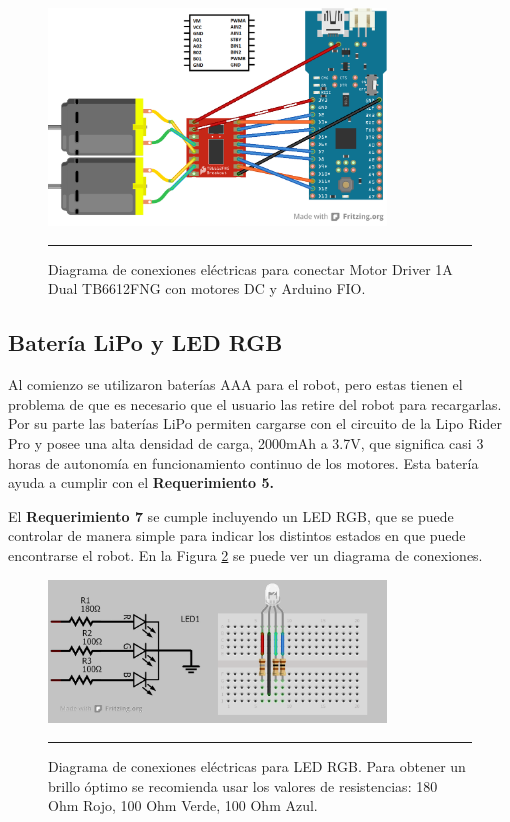 \begin{figure}[htbp]
	\centering
		\includegraphics[width=0.8\textwidth]{./Figures/MODI/MODI_without_LED_bb.png}
		\rule{35em}{0.5pt}
	\caption[Conexión eléctrica Motor Driver 1A Dual TB6612FNG]{Diagrama de conexiones eléctricas para conectar Motor Driver 1A Dual TB6612FNG con motores DC y Arduino FIO.}
	\label{fig:TB6612FNG}
\end{figure}


\subsection{Batería LiPo y LED RGB}

Al comienzo se utilizaron baterías AAA para el robot, pero estas tienen el problema de que es necesario que el usuario las retire del robot para recargarlas. Por su parte las baterías LiPo permiten cargarse con el circuito de la Lipo Rider Pro y posee una alta densidad de carga, 2000mAh a 3.7V, que significa casi 3 horas de autonomía en funcionamiento continuo de los motores. Esta batería ayuda a cumplir con el \textbf{Requerimiento 5.}

El \textbf{Requerimiento 7} se cumple incluyendo un LED RGB, que se puede controlar de manera simple para indicar los distintos estados en que puede encontrarse el robot. En la Figura \ref{fig:LED} se puede ver un diagrama de conexiones.

\begin{figure}[htbp]
	\centering
		\includegraphics[width=0.8\textwidth]{./Figures/MODI/RGBLED.png}
		\rule{35em}{0.5pt}
	\caption[Conexión eléctrica LED RGB]{Diagrama de conexiones eléctricas para LED RGB. Para obtener un brillo óptimo se recomienda usar los valores de resistencias: 180 Ohm Rojo, 100 Ohm Verde, 100 Ohm Azul.}
	\label{fig:LED}
\end{figure}

